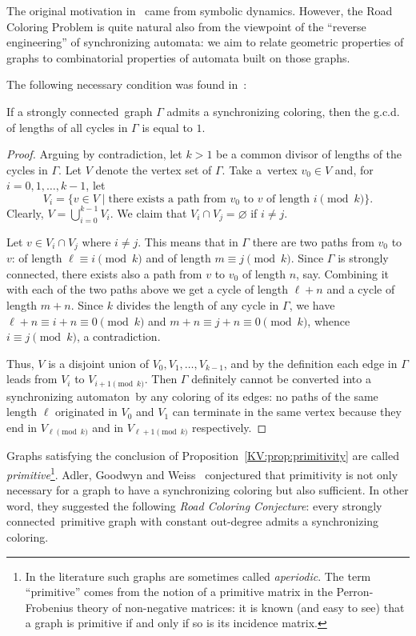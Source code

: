 \documentclass{irmaart}
\newcommand{\sa}{synchronizing au\-tom\-a\-ta}
\newcommand{\san}{synchronizing au\-tom\-a\-ton}
\newcommand{\scn}{strongly connected}
\theoremstyle{plain}
\begin{document}
The original motivation in~\cite{Adler&Weiss:1970,Adler&Goodwyn&Weiss:1977}
came from symbolic dynamics. However, the Road Coloring Problem is quite
natural also from the viewpoint of the ``reverse engineering'' of \sa: we aim
to relate geometric properties of graphs to combinatorial properties of
automata built on those graphs.

The following necessary condition was found in~\cite{Adler&Goodwyn&Weiss:1977}:
\begin{proposition}
\label{KV:prop:primitivity} If a \scn\ graph $\Gamma$ admits a synchronizing
coloring, then the g.c.d. of lengths of all cycles in $\Gamma$ is equal to $1$.
\end{proposition}

\begin{proof}
Arguing by contradiction, let $k>1$ be a common divisor of lengths of the
cycles in $\Gamma$. Let $V$ denote the vertex set of $\Gamma$. Take a~vertex
$v_0\in V$ and, for $i=0,1,\dots,k-1$, let
$$V_i=\{v\in V\mid \text{there exists a path from } v_0 \text{ to } v \text{ of length }
i\!\!\pmod{k}\}.$$ Clearly, $V=\bigcup\limits_{i=0}^{k-1} V_i$. We claim that
$V_i\cap V_j=\varnothing$ if $i\ne j$.

Let $v\in V_i\cap V_j$ where $i\ne j$. This means that in $\Gamma$ there are
two paths from $v_0$ to $v$: of length $\ell\equiv i\!\!\pmod{k}$ and of length
$m\equiv j\!\!\pmod{k}$. Since $\Gamma$ is \scn, there exists also a path from
$v$ to $v_0$ of length $n$, say. Combining it with each of the two paths above
we get a cycle of length $\ell+n$ and a cycle of length $m+n$. Since $k$
divides the length of any cycle in $\Gamma$, we have $\ell+n\equiv i+n\equiv
0\!\!\pmod{k}$ and $m+n\equiv j+n\equiv 0\!\!\pmod{k}$, whence $i\equiv
j\!\!\pmod{k}$, a contradiction.

Thus, $V$ is a disjoint union of $V_0,V_1,\dots,V_{k-1}$, and by the definition
each edge in $\Gamma$ leads from $V_i$ to $V_{i+1\!\!\pmod{k}}$. Then $\Gamma$
definitely cannot be converted into a \san\ by any coloring of its edges: no
paths of the same length $\ell$ originated in $V_0$ and $V_1$ can terminate in
the same vertex because they end in $V_{\ell\!\!\pmod{k}}$ and in
$V_{\ell+1\!\!\pmod{k}}$ respectively.
\end{proof}

Graphs satisfying the conclusion of Proposition~\ref{KV:prop:primitivity} are
called \emph{primitive}\footnote{In the literature such graphs are sometimes
called \emph{aperiodic}. The term ``primitive'' comes from the notion of a
primitive matrix in the Perron-Frobenius theory of non-negative matrices: it is
known (and easy to see) that a graph is primitive if and only if so is its
incidence matrix.}. Adler, Goodwyn and
Weiss~\cite{Adler&Goodwyn&Weiss:1977} conjectured that primitivity is not only
necessary for a graph to have a synchronizing coloring but also sufficient. In
other word, they suggested the following \emph{Road Coloring
Conjecture}: every \scn\ primitive graph with
constant out-degree admits a synchronizing coloring.
\end{document}
